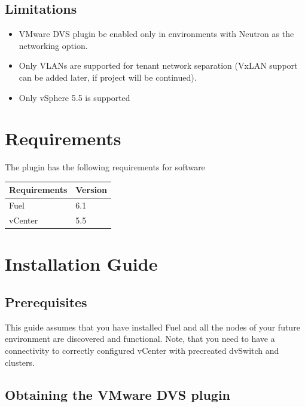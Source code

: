 \documentclass{article}
\begin{document}
\subsection{Limitations}

\begin{itemize}

\item VMware DVS plugin be enabled only in environments with Neutron as the networking option.

\item Only VLANs are supported for tenant network separation (VxLAN support can be added later, if project will be continued).

\item Only vSphere 5.5 is supported

\end{itemize}

\section{Requirements}

The plugin has the following requirements for software

\begin{table}[h]
\begin{tabular}{|p{8cm}|p{8cm}|}
\hline
\textbf{Requirements} & \textbf{Version} \\ \hline
Fuel & 6.1 \\ \hline
vCenter & 5.5 \\ \hline
\end{tabular}
\end{table}

\section{Installation Guide}

\subsection{Prerequisites}

This guide assumes that you have installed Fuel and all the nodes of your future environment are discovered and functional. Note, that you need to have a connectivity to correctly configured vCenter with precreated dvSwitch and clusters.

\subsection{Obtaining the VMware DVS plugin}
\end{document}
